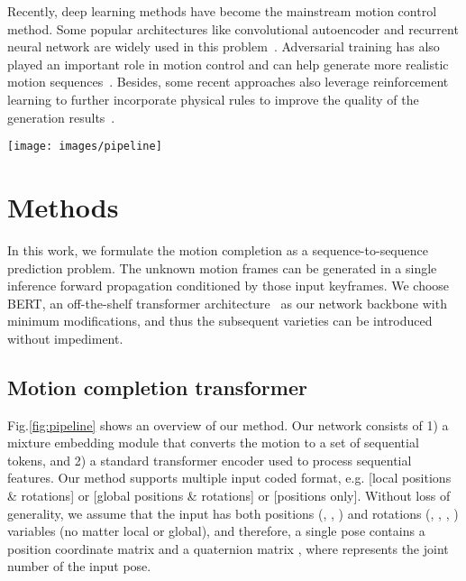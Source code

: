 \documentclass[10pt,twocolumn,letterpaper]{article}
\begin{document}
Recently, deep learning methods have become the mainstream motion control method. Some popular architectures like convolutional autoencoder and recurrent neural network are widely used in this problem~\cite{holden2015learning, holden2016deep, holden2017phase,lee2018interactive}. Adversarial training has also played an important role in motion control and can help generate more realistic motion sequences~\cite{barsoum2018hp, gui2018adversarial, harvey2020robust}. Besides, some recent approaches also leverage reinforcement learning to further incorporate physical rules to improve the quality of the generation results~\cite{coros2009robust, yin2007simbicon,baram2016model, peng2017deeploco,peng2018deepmimic,bergamin2019drecon}.

\begin{figure*}[ht]
  \centering
  \texttt{[image: images/pipeline]}
  \caption{An overview of our method. Our method consists of a standard transformer encoder, a mixture embedding layer and input/output convolutional heads. In motion completion, the unknown input frames are first generated by using linear interpolation ({\color{red} shown in red}) before being fed to the model. Our method takes in a whole masked sequence and complete the prediction within only a single forward propagation.}
  \label{fig:pipeline}
\end{figure*}


\section{Methods}

In this work, we formulate the motion completion as a sequence-to-sequence prediction problem. The unknown motion frames can be generated in a single inference forward propagation conditioned by those input keyframes. We choose BERT, an off-the-shelf transformer architecture~\cite{devlin2018bert} as our network backbone with minimum modifications, and thus the subsequent varieties can be introduced without impediment.

\subsection{Motion completion transformer} \label{sec:mocot}

Fig.\ref{fig:pipeline} shows an overview of our method. Our network consists of 1) a mixture embedding module that converts the motion to a set of sequential tokens, and 2) a standard transformer encoder used to process sequential features. Our method supports multiple input coded format, e.g. [local positions \& rotations] or [global positions \& rotations] or [positions only]. Without loss of generality, we assume that the input has both positions (, , ) and rotations (, , , ) variables (no matter local or global), and therefore, a single pose contains a position coordinate matrix  and a quaternion matrix , where  represents the joint number of the input pose.
\end{document}
